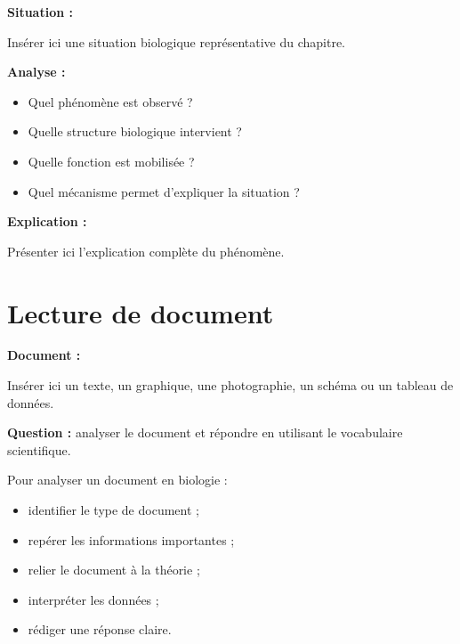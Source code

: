\documentclass[11pt,a4paper]{article}
\begin{document}
\begin{cadreexemple}
\textbf{Situation :}

Insérer ici une situation biologique représentative du chapitre.

\medskip

\textbf{Analyse :}
\begin{itemize}
    \item Quel phénomène est observé ?
    \item Quelle structure biologique intervient ?
    \item Quelle fonction est mobilisée ?
    \item Quel mécanisme permet d’expliquer la situation ?
\end{itemize}

\medskip

\textbf{Explication :}

Présenter ici l’explication complète du phénomène.
\end{cadreexemple}

\section{Lecture de document}

\begin{cadreenonce}
\textbf{Document :}

Insérer ici un texte, un graphique, une photographie, un schéma ou un tableau de données.

\medskip

\textbf{Question :} analyser le document et répondre en utilisant le vocabulaire scientifique.
\end{cadreenonce}

\begin{cadreaide}
Pour analyser un document en biologie :
\begin{itemize}
    \item identifier le type de document ;
    \item repérer les informations importantes ;
    \item relier le document à la théorie ;
    \item interpréter les données ;
    \item rédiger une réponse claire.
\end{itemize}
\end{cadreaide}
\end{document}
